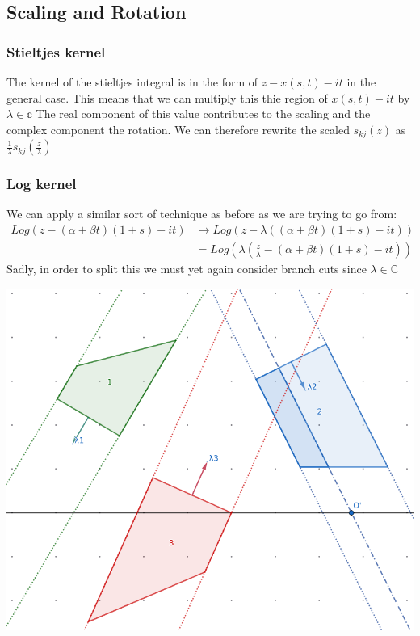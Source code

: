 \documentclass{article}
\begin{document}
\subsection{Scaling and Rotation}
\subsubsection{Stieltjes kernel}
The kernel of the stieltjes integral is in the form of $z-x(s,t)-it$ in the general case.
This means that we can multiply this thie region of $x(s,t)-it$ by $\lambda\in\mathbb{c}$
The real component of this value contributes to the scaling and the complex component the rotation.
We can therefore rewrite the scaled $s_{kj}(z)$ as $\frac{1}{\lambda}s_{kj}(\frac{z}{\lambda})$
\subsubsection{Log kernel}
We can apply a similar sort of technique as before as we are trying to go from:
\begin{align}
    Log(z-(\alpha+\beta t)(1+s)-it)&\rightarrow Log(z-\lambda((\alpha+\beta t)(1+s)-it))\\
    &= Log(\lambda(\frac{z}{\lambda}-(\alpha+\beta t)(1+s)-it))
\end{align}
Sadly, in order to split this we must yet again consider branch cuts since $\lambda\in\mathbb{C}$

\includegraphics[width=\textwidth]{lscale}
\end{document}

